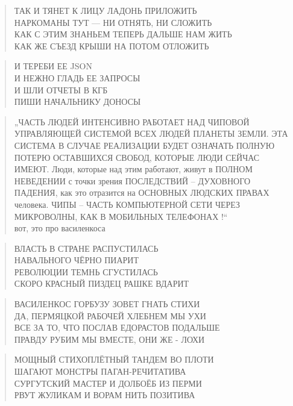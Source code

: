 \poemtitle{***}
\begin{verse}
ТАК И ТЯНЕТ К ЛИЦУ ЛАДОНЬ ПРИЛОЖИТЬ\\
НАРКОМАНЫ ТУТ — НИ ОТНЯТЬ, НИ СЛОЖИТЬ\\
КАК С ЭТИМ ЗНАНЬЕМ ТЕПЕРЬ ДАЛЬШЕ НАМ ЖИТЬ\\
КАК ЖЕ СЪЕЗД КРЫШИ НА ПОТОМ ОТЛОЖИТЬ
\end{verse}

\poemtitle{***}
\begin{verse}
И ТЕРЕБИ ЕЕ JSON\\
И НЕЖНО ГЛАДЬ ЕЕ ЗАПРОСЫ\\
И ШЛИ ОТЧЕТЫ В КГБ\\
ПИШИ НАЧАЛЬНИКУ ДОНОСЫ
\end{verse}

\poemtitle{***}
\begin{verse}
„ЧАСТЬ ЛЮДЕЙ ИНТЕНСИВНО РАБОТАЕТ НАД ЧИПОВОЙ УПРАВЛЯЮЩЕЙ СИСТЕМОЙ ВСЕХ ЛЮДЕЙ ПЛАНЕТЫ ЗЕМЛИ. ЭТА СИСТЕМА В СЛУЧАЕ РЕАЛИЗАЦИИ БУДЕТ ОЗНАЧАТЬ ПОЛНУЮ ПОТЕРЮ ОСТАВШИХСЯ СВОБОД, КОТОРЫЕ ЛЮДИ СЕЙЧАС ИМЕЮТ. Люди, которые над этим работают, живут в ПОЛНОМ НЕВЕДЕНИИ с точки зрения ПОСЛЕДСТВИЙ – ДУХОВНОГО ПАДЕНИЯ, как это отразится на ОСНОВНЫХ ЛЮДСКИХ ПРАВАХ человека. ЧИПЫ – ЧАСТЬ КОМПЬЮТЕРНОЙ СЕТИ ЧЕРЕЗ МИКРОВОЛНЫ, КАК В МОБИЛЬНЫХ ТЕЛЕФОНАХ !“\\
вот, это про василенкоса
\end{verse}

\poemtitle{***}
\begin{verse}
ВЛАСТЬ В СТРАНЕ РАСПУСТИЛАСЬ\\
НАВАЛЬНОГО ЧЁРНО ПИАРИТ\\
РЕВОЛЮЦИИ ТЕМНЬ СГУСТИЛАСЬ\\
СКОРО КРАСНЫЙ ПИЗДЕЦ РАШКЕ ВДАРИТ
\end{verse}

\poemtitle{***}
\begin{verse}
ВАСИЛЕНКОС ГОРБУЗУ ЗОВЕТ ГНАТЬ СТИХИ\\
ДА, ПЕРМЯЦКОЙ РАБОЧЕЙ ХЛЕБНЕМ МЫ УХИ\\
ВСЕ ЗА ТО, ЧТО ПОСЛАВ ЕДОРАСТОВ ПОДАЛЬШЕ\\
ПРАВДУ РУБИМ МЫ ВМЕСТЕ, ОНИ ЖЕ - ЛОХИ
\end{verse}

\poemtitle{***}
\begin{verse}
МОЩНЫЙ СТИХОПЛЁТНЫЙ ТАНДЕМ ВО ПЛОТИ\\
ШАГАЮТ МОНСТРЫ ПАГАН-РЕЧИТАТИВА\\
СУРГУТСКИЙ МАСТЕР И ДОЛБОЁБ ИЗ ПЕРМИ\\
РВУТ ЖУЛИКАМ И ВОРАМ НИТЬ ПОЗИТИВА
\end{verse}

